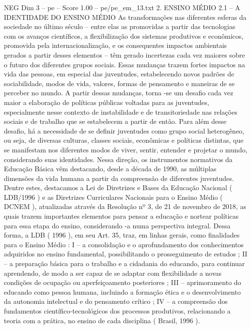 \begin{textsample}{NEG Dim 3 – pe – Score 1.00 – pe/pe\_em\_13.txt}  \label{ex:f3_neg_020}
2.
ENSINO MÉDIO 2.1 – A IDENTIDADE DO ENSINO MÉDIO As transformações nas diferentes esferas da sociedade no último século – entre elas as promovidas a partir das tecnologias com os avanços científicos, a flexibilização dos sistemas produtivos e econômicos, promovida pela internacionalização, e os consequentes impactos ambientais gerados a partir desses elementos – têm gerado incertezas cada vez maiores sobre o futuro dos diferentes grupos sociais.
Essas mudanças trazem fortes impactos na vida das pessoas, em especial das juventudes, estabelecendo novos padrões de sociabilidade, modos de vida, valores, formas de pensamento e maneiras de se perceber no mundo.
A partir dessas mudanças, torna -se um desafio cada vez maior a elaboração de políticas públicas voltadas para as juventudes, especialmente nesse contexto de instabilidade e de transitoriedade nas relações sociais e de trabalho que se estabelecem a partir de então.
Para além desse desafio, há a necessidade de se definir juventudes como grupo social heterogêneo, ou seja, de diversas culturas, classes sociais, econômicas e políticas distintas, que se manifestam nos diferentes modos de viver, sentir, entender e projetar o mundo, considerando suas identidades.
Nessa direção, os instrumentos normativos da Educação Básica vêm destacando, desde a década de 1990, as múltiplas dimensões da vida humana a partir da compreensão de diferentes juventudes.
Dentre estes, destacamos a Lei de Diretrizes e Bases da Educação Nacional ( LDB/1996 ) e as Diretrizes Curriculares Nacionais para o Ensino Médio ( DCNEM ), atualizadas através da Resolução nº 3, de 21 de novembro de 2018, as quais trazem importantes elementos para pensar a educação e nortear políticas para essa etapa do ensino, considerando -a numa perspectiva integral.
Dessa forma, a LDB ( 1996 ), em seu Art. 35, traz, em linhas gerais, como finalidades para o Ensino Médio : I – a consolidação e o aprofundamento dos conhecimentos adquiridos no ensino fundamental, possibilitando o prosseguimento de estudos ; II – a preparação básica para o trabalho e a cidadania do educando, para continuar aprendendo, de modo a ser capaz de se adaptar com flexibilidade a novas condições de ocupação ou aperfeiçoamento posteriores ; III – aprimoramento do educando como pessoa humana, incluindo a formação ética e o desenvolvimento da autonomia intelectual e do pensamento crítico ; IV – a compreensão dos fundamentos científico-tecnológicos dos processos produtivos, relacionando a teoria com a prática, no ensino de cada disciplina ( Brasil, 1996 ).

\end{textsample}
